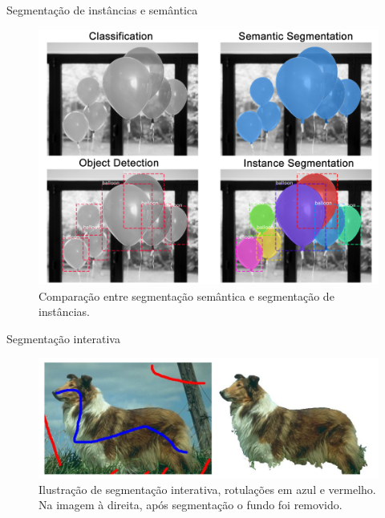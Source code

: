 \documentclass{templatebeamerufc/libs/ufc_format}
\begin{document}
\begin{frame}{Segmentação de instâncias e semântica}
  \begin{figure}\label{fig:semantic-vs-instance-segmentation}
    \centering
    \caption{Comparação entre segmentação semântica e segmentação de instâncias.}
    \includegraphics[scale=0.23]{figuras/image-segmentation-types}
  \end{figure}
\end{frame}

\begin{frame}{Segmentação interativa}
  \begin{figure}\label{fig:interactive--segmentation}
    \centering
    \caption{Ilustração de segmentação interativa, rotulações em azul  e
      vermelho.\\ Na imagem à direita, após segmentação o fundo foi removido.}
    \includegraphics[scale=0.6]{figuras/interactive-segmentation-2008}
  \end{figure}
\end{frame}
\end{document}
